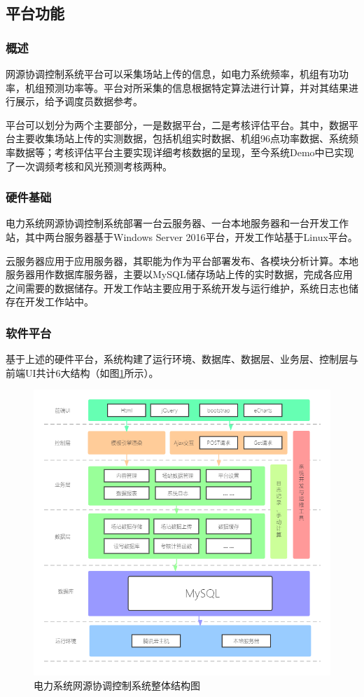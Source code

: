 \documentclass[winfonts,UTF8,a4paper]{ctexart}
\begin{document}
\subsection{平台功能}
\subsubsection{概述}

网源协调控制系统平台可以采集场站上传的信息，如电力系统频率，机组有功功率，机组预测功率等。平台对所采集的信息根据特定算法进行计算，并对其结果进行展示，给予调度员数据参考。

平台可以划分为两个主要部分，一是数据平台，二是考核评估平台。其中，数据平台主要收集场站上传的实测数据，包括机组实时数据、机组96点功率数据、系统频率数据等；考核评估平台主要实现详细考核数据的呈现，至今系统Demo中已实现了一次调频考核和风光预测考核两种。

\subsubsection{硬件基础}
电力系统网源协调控制系统部署一台云服务器、一台本地服务器和一台开发工作站，其中两台服务器基于Windows Server 2016平台，开发工作站基于Linux平台。

云服务器应用于应用服务器，其职能为作为平台部署发布、各模块分析计算。本地服务器用作数据库服务器，主要以MySQL储存场站上传的实时数据，完成各应用之间需要的数据储存。开发工作站主要应用于系统开发与运行维护，系统日志也储存在开发工作站中。

\subsubsection{软件平台}
基于上述的硬件平台，系统构建了运行环境、数据库、数据层、业务层、控制层与前端UI共计6大结构（如图\ref{电力系统网源协调控制系统整体结构图}所示）。
\begin{figure}[H]
	\centering
	\includegraphics[width=0.9\linewidth]{pic/系统框架结构}
	\caption{电力系统网源协调控制系统整体结构图}
	\label{电力系统网源协调控制系统整体结构图}
\end{figure}
\end{document}
